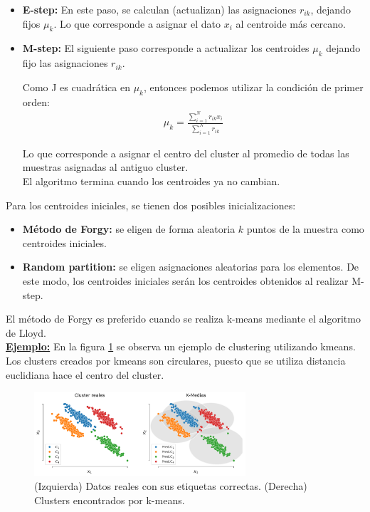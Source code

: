 \begin{itemize}
    \item \textbf{E-step:} En este paso, se calculan (actualizan) las asignaciones $r_{ik}$, dejando fijos $\mu_k$. Lo que corresponde a asignar el dato $x_i$ al centroide más cercano.
    \item \textbf{M-step:} El siguiente paso corresponde a actualizar los centroides $\mu_k$ dejando fijo las asignaciones $r_{ik}$.
    
    Como J es cuadrática en $\mu_k$, entonces podemos utilizar la condición de primer orden:
    \begin{align}
        \mu_k = \frac{\sum_{i=1}^N r_{ik}x_i}{\sum_{i=1}^N r_{ik}}
    \end{align}
    
    Lo que corresponde a asignar el centro del cluster al promedio de todas las muestras asignadas al antiguo cluster.\\
    
    El algoritmo termina cuando los centroides ya no cambian.
\end{itemize}


Para los centroides iniciales, se tienen dos posibles inicializaciones:

\begin{itemize}
	\item \textbf{Método de Forgy:} se eligen de forma aleatoria $k$ puntos de la muestra como centroides iniciales.
	\item \textbf{Random partition:} se eligen asignaciones aleatorias para los elementos. De este modo, los centroides iniciales serán los centroides obtenidos al realizar M-step.
\end{itemize}

El método de Forgy es preferido cuando se realiza k-means mediante el algoritmo de Lloyd.\\

\underline{\textbf{Ejemplo:}} En la figura \ref{fig:kmeans_1} se observa un ejemplo de clustering utilizando kmeans. Los clusters creados por kmeans son circulares, puesto que se utiliza distancia euclidiana hace el centro del cluster.\\

\begin{figure}[h]
  \centering
  \includegraphics[width=0.7\textwidth]{img/cap6_k_medias}
  \caption{(Izquierda) Datos reales con sus etiquetas correctas. (Derecha) Clusters encontrados por k-means.}
  \label{fig:kmeans_1}
\end{figure}

